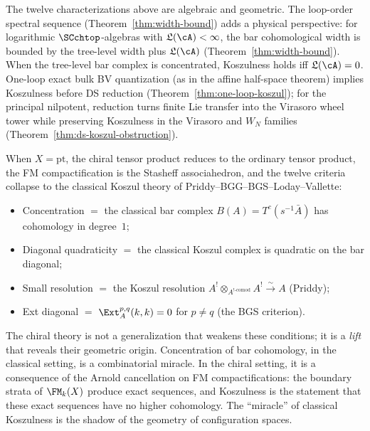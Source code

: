 \begin{remark}
The twelve characterizations above are algebraic and geometric. The
loop-order spectral sequence
(Theorem~\ref{thm:width-bound}) adds a physical
perspective: for logarithmic $\SCchtop$-algebras
with $\mathfrak{L}(\cA)<\infty$, the bar
cohomological width is bounded by the tree-level width plus
$\mathfrak{L}(\cA)$ (Theorem~\ref{thm:width-bound}). When
the tree-level bar complex is concentrated, Koszulness holds iff
$\mathfrak{L}(\cA)=0$.
One-loop exact bulk BV quantization (as in the affine half-space
theorem) implies Koszulness before DS reduction
(Theorem~\ref{thm:one-loop-koszul}); for the principal nilpotent,
reduction turns finite Lie transfer into the Virasoro wheel tower
while preserving Koszulness
in the Virasoro and $W_N$ families
(Theorem~\ref{thm:ds-koszul-obstruction}).
\end{remark}

\begin{remark}
\label{rem:classical-specialization}
When $X = \mathrm{pt}$, the chiral tensor product reduces to the
ordinary tensor product, the FM compactification is the
Stasheff associahedron, and the twelve criteria collapse to
the classical Koszul theory of Priddy--BGG--BGS--Loday--Vallette:
\begin{itemize}
\item Concentration $=$ the classical bar complex
 $B(A) = T^c(s^{-1}\bar{A})$ has cohomology in degree~$1$;
\item Diagonal quadraticity $=$ the classical Koszul complex is
 quadratic on the bar diagonal;
\item Small resolution $=$ the Koszul resolution
 $A^! \otimes_{A^{!\text{-comod}}} A^!
 \xrightarrow{\sim} A$ (Priddy);
\item Ext diagonal $=$ $\Ext^{p,q}_A(k,k) = 0$ for $p \neq q$
 (the BGS criterion).
\end{itemize}
The chiral theory is not a generalization that weakens these
conditions; it is a \emph{lift} that reveals their geometric origin.
Concentration of bar cohomology, in the classical setting, is a
combinatorial miracle. In the chiral setting, it is a consequence
of the Arnold cancellation on FM compactifications: the boundary
strata of $\FM_k(X)$ produce exact sequences, and Koszulness
is the statement that these exact sequences have no higher
cohomology. The ``miracle'' of classical Koszulness is the shadow
of the geometry of configuration spaces.
\end{remark}

